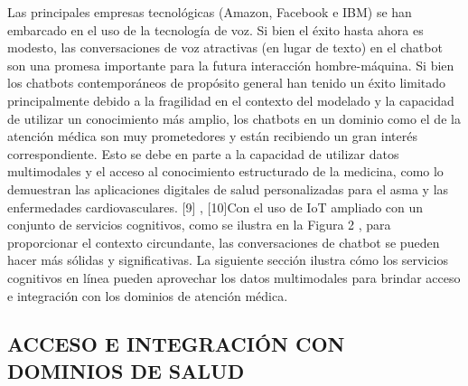 Las principales empresas tecnológicas (Amazon, Facebook e IBM) se han embarcado en el uso de la tecnología de voz. Si bien el éxito hasta ahora es modesto, las conversaciones de voz atractivas (en lugar de texto) en el chatbot son una promesa importante para la futura interacción hombre-máquina. Si bien los chatbots contemporáneos de propósito general han tenido un éxito limitado principalmente debido a la fragilidad en el contexto del modelado y la capacidad de utilizar un conocimiento más amplio, los chatbots en un dominio como el de la atención médica son muy prometedores y están recibiendo un gran interés correspondiente. Esto se debe en parte a la capacidad de utilizar datos multimodales y el acceso al conocimiento estructurado de la medicina, como lo demuestran las aplicaciones digitales de salud personalizadas para el asma y las enfermedades cardiovasculares. [9] , [10]Con el uso de IoT ampliado con un conjunto de servicios cognitivos, como se ilustra en la Figura 2 , para proporcionar el contexto circundante, las conversaciones de chatbot se pueden hacer más sólidas y significativas. La siguiente sección ilustra cómo los servicios cognitivos en línea pueden aprovechar los datos multimodales para brindar acceso e integración con los dominios de atención médica.

\subsection{ACCESO E INTEGRACIÓN CON DOMINIOS DE SALUD}

